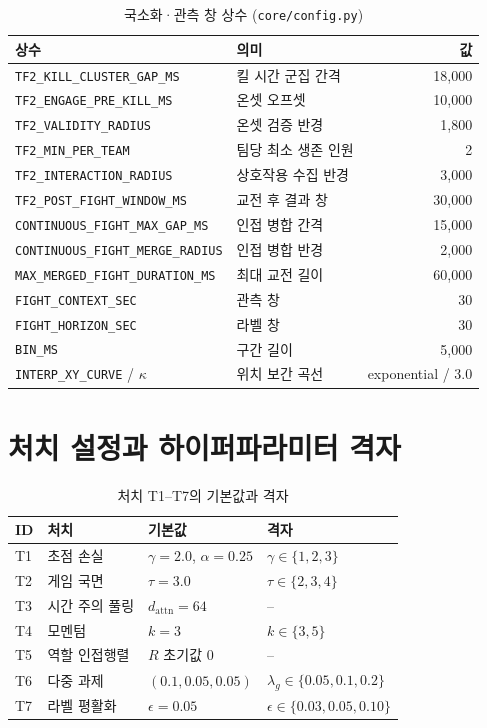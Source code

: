 \begin{table}[htbp]
  \centering
  \caption{국소화·관측 창 상수 (\texttt{core/config.py})}
  \label{tab:app-detection}
  \small
  \begin{tabular}{@{}llr@{}}
    \toprule
    상수 & 의미 & 값 \\
    \midrule
    \texttt{TF2\_KILL\_CLUSTER\_GAP\_MS} & 킬 시간 군집 간격 & 18{,}000 \\
    \texttt{TF2\_ENGAGE\_PRE\_KILL\_MS} & 온셋 오프셋 & 10{,}000 \\
    \texttt{TF2\_VALIDITY\_RADIUS} & 온셋 검증 반경 & 1{,}800 \\
    \texttt{TF2\_MIN\_PER\_TEAM} & 팀당 최소 생존 인원 & 2 \\
    \texttt{TF2\_INTERACTION\_RADIUS} & 상호작용 수집 반경 & 3{,}000 \\
    \texttt{TF2\_POST\_FIGHT\_WINDOW\_MS} & 교전 후 결과 창 & 30{,}000 \\
    \texttt{CONTINUOUS\_FIGHT\_MAX\_GAP\_MS} & 인접 병합 간격 & 15{,}000 \\
    \texttt{CONTINUOUS\_FIGHT\_MERGE\_RADIUS} & 인접 병합 반경 & 2{,}000 \\
    \texttt{MAX\_MERGED\_FIGHT\_DURATION\_MS} & 최대 교전 길이 & 60{,}000 \\
    \texttt{FIGHT\_CONTEXT\_SEC} & 관측 창 & 30 \\
    \texttt{FIGHT\_HORIZON\_SEC} & 라벨 창 & 30 \\
    \texttt{BIN\_MS} & 구간 길이 & 5{,}000 \\
    \texttt{INTERP\_XY\_CURVE} / $\kappa$ & 위치 보간 곡선 & exponential / 3.0 \\
    \bottomrule
  \end{tabular}
\end{table}

\chapter{처치 설정과 하이퍼파라미터 격자}
\label{app:treatments}

\begin{table}[htbp]
  \centering
  \caption{처치 T1--T7의 기본값과 격자}
  \label{tab:app-treatments}
  \small
  \begin{tabular}{@{}llll@{}}
    \toprule
    ID & 처치 & 기본값 & 격자 \\
    \midrule
    T1 & 초점 손실 & $\gamma = 2.0$, $\alpha = 0.25$ & $\gamma \in \{1, 2, 3\}$ \\
    T2 & 게임 국면 & $\tau = 3.0$ & $\tau \in \{2, 3, 4\}$ \\
    T3 & 시간 주의 풀링 & $d_{\mathrm{attn}} = 64$ & -- \\
    T4 & 모멘텀 & $k = 3$ & $k \in \{3, 5\}$ \\
    T5 & 역할 인접행렬 & $R$ 초기값 0 & -- \\
    T6 & 다중 과제 & $(0.1, 0.05, 0.05)$ & $\lambda_g \in \{0.05, 0.1, 0.2\}$ \\
    T7 & 라벨 평활화 & $\epsilon = 0.05$ & $\epsilon \in \{0.03, 0.05, 0.10\}$ \\
    \bottomrule
  \end{tabular}
\end{table}
